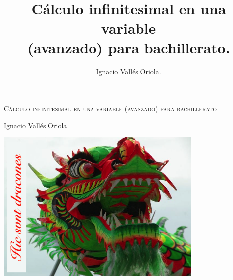 \documentclass[a4paper, 11pt, spanish]{book}
\title{Cálculo infinitesimal en una variable \\ (avanzado) para bachillerato.}
\author{Ignacio Vallés Oriola.}
\date{}
\numberwithin{equation}{chapter}
\numberwithin{lema}{chapter}
\numberwithin{teor}{chapter}
\numberwithin{coro}{chapter}
\numberwithin{prop}{chapter}
\numberwithin{defi}{chapter}
\numberwithin{axio}{chapter}
\numberwithin{ejem}{chapter}
\numberwithin{ejre}{chapter}
\numberwithin{ejer}{chapter}
\begin{document}
\begin{titlepage}
	\centering
	\vspace*{\fill}
	{\scshape\LARGE Cálculo infinitesimal en una variable (avanzado) para bachillerato \par}
	\vspace{1cm}
	{\Large Ignacio Vallés Oriola \par}
	\vspace{3cm}
	\includegraphics[width=0.75\textwidth]{imagenes/hic-svnt-dracones}
	\vspace{3cm}
\end{titlepage}

\tableofcontents















\appendix

		
\end{document}
